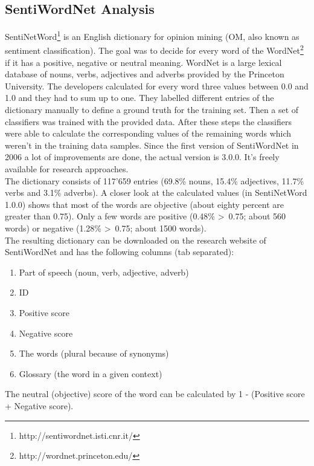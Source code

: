 \documentclass[a4paper]{article}
\begin{document}
\subsection{SentiWordNet Analysis}
SentiNetWord\footnote{http://sentiwordnet.isti.cnr.it/} is an English dictionary for opinion mining (OM, also known as sentiment classification). The goal was to decide for every word of the WordNet\footnote{http://wordnet.princeton.edu/} if it has a positive, negative or neutral meaning. WordNet is a large lexical database of nouns, verbs, adjectives and adverbs provided by the Princeton University. The developers calculated for every word three values between 0.0 and 1.0 and they had to sum up to one. They labelled different entries of the dictionary manually to define a ground truth for the training set. Then a set of classifiers was trained with the provided data. After these steps the classifiers were able to calculate the corresponding values of the remaining words which weren't in the training data samples. Since the first version of SentiWordNet in 2006 a lot of improvements are done, the actual version is 3.0.0. It's freely available for research approaches.\\
The dictionary consists of 117'659 entries (69.8\% nouns, 15.4\% adjectives, 11.7\% verbs and 3.1\% adverbs). A closer look at the calculated values (in SentiNetWord 1.0.0) shows that most of the words are objective (about eighty percent are greater than 0.75). Only a few words are positive (0.48\% \textgreater \ 0.75; about 560 words) or negative (1.28\% \textgreater \ 0.75; about 1500 words).\\
The resulting dictionary can be downloaded on the research website of SentiWordNet and has the following columns (tab separated):
\begin{enumerate}
	\item Part of speech (noun, verb, adjective, adverb)
  \item ID
	\item Positive score
	\item Negative score
	\item The words (plural because of synonyms)
	\item Glossary (the word in a given context)
\end{enumerate}
The neutral (objective) score of the word can be calculated by 1 - (Positive score + Negative score).
\end{document}

